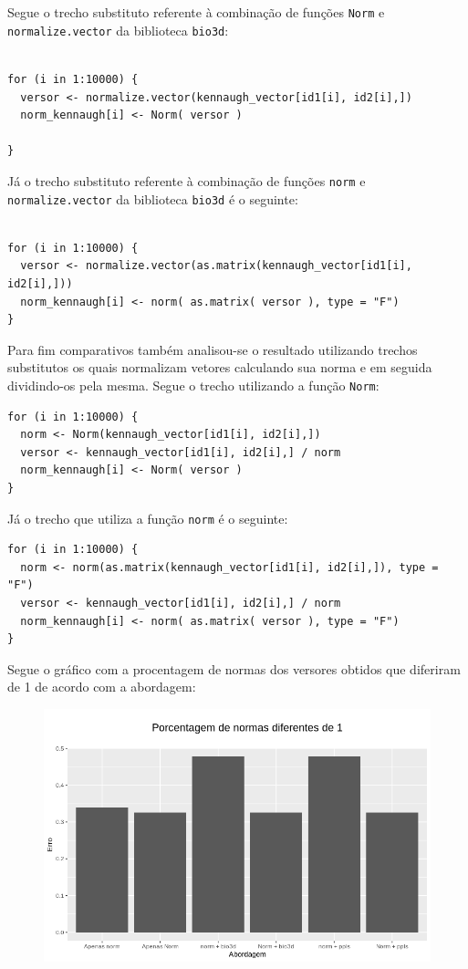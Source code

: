 \documentclass[12pt]{article}
\begin{document}
Segue o trecho substituto referente à combinação de funções \texttt{Norm} e \texttt{normalize.vector} da biblioteca \texttt{bio3d}:

\begin{verbatim}

for (i in 1:10000) {
  versor <- normalize.vector(kennaugh_vector[id1[i], id2[i],])
  norm_kennaugh[i] <- Norm( versor )
  
}
\end{verbatim}

Já o trecho substituto referente à combinação de funções \texttt{norm} e \texttt{normalize.vector} da biblioteca \texttt{bio3d} é o seguinte:

\begin{verbatim}

for (i in 1:10000) {
  versor <- normalize.vector(as.matrix(kennaugh_vector[id1[i], id2[i],]))
  norm_kennaugh[i] <- norm( as.matrix( versor ), type = "F")
}

\end{verbatim}

Para fim comparativos também analisou-se o resultado utilizando trechos substitutos os quais normalizam vetores calculando sua norma e em seguida dividindo-os pela mesma. Segue o trecho utilizando a função \texttt{Norm}:

\begin{verbatim}
for (i in 1:10000) {
  norm <- Norm(kennaugh_vector[id1[i], id2[i],])
  versor <- kennaugh_vector[id1[i], id2[i],] / norm
  norm_kennaugh[i] <- Norm( versor )
}
\end{verbatim}

Já o trecho que utiliza a função \texttt{norm} é o seguinte:

\begin{verbatim}
for (i in 1:10000) {
  norm <- norm(as.matrix(kennaugh_vector[id1[i], id2[i],]), type = "F")
  versor <- kennaugh_vector[id1[i], id2[i],] / norm
  norm_kennaugh[i] <- norm( as.matrix( versor ), type = "F")
}
\end{verbatim}

Segue o gráfico com a procentagem de normas dos versores obtidos que diferiram de 1 de acordo com a abordagem:

\begin{figure}[!h]
    \centering
    \includegraphics[width = \linewidth]{../../Figures/report_18_12_06/dif_one.png}
\end{figure}
\newpage
\end{document}
